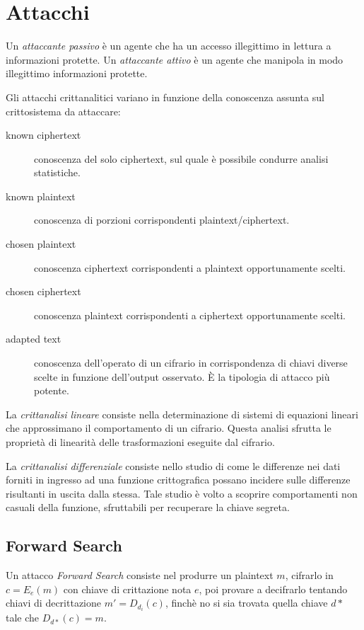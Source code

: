 \chapter{Attacchi}
\label{chp:attacks}

Un \textit{attaccante passivo} è un agente che ha un accesso illegittimo in lettura a informazioni protette.
Un \textit{attaccante attivo} è un agente che manipola in modo illegittimo informazioni protette.


Gli attacchi crittanalitici variano in funzione della conoscenza assunta sul crittosistema da attaccare:

\begin{description}
  \item[known ciphertext] conoscenza del solo ciphertext, sul quale è possibile condurre analisi statistiche.
  \item[known plaintext] conoscenza di porzioni corrispondenti plaintext/ciphertext.
  \item[chosen plaintext] conoscenza ciphertext corrispondenti a plaintext opportunamente scelti.
  \item[chosen ciphertext] conoscenza plaintext corrispondenti a ciphertext opportunamente scelti.
  \item[adapted text] conoscenza dell'operato di un cifrario in corrispondenza di chiavi diverse scelte in funzione dell'output osservato. È la tipologia di attacco più potente.
\end{description}

La \textit{crittanalisi lineare} consiste nella determinazione di sistemi di equazioni lineari che approssimano il comportamento di un cifrario. Questa analisi sfrutta le proprietà di linearità delle trasformazioni eseguite dal cifrario.

La \textit{crittanalisi differenziale} consiste nello studio di come le differenze nei dati forniti in ingresso ad una funzione crittografica possano incidere sulle differenze risultanti in uscita dalla stessa. Tale studio è volto a scoprire comportamenti non casuali della funzione, sfruttabili per recuperare la chiave segreta.

\section{Forward Search}
Un attacco \textit{Forward Search} consiste nel produrre un plaintext $m$, cifrarlo in $c=E_{e}(m)$ con chiave di crittazione nota $e$, poi provare a decifrarlo tentando chiavi di decrittazione $m'=D_{d_{i}}(c)$, finchè no si sia trovata quella chiave $d*$ tale che $D_{d*}(c)=m$.

